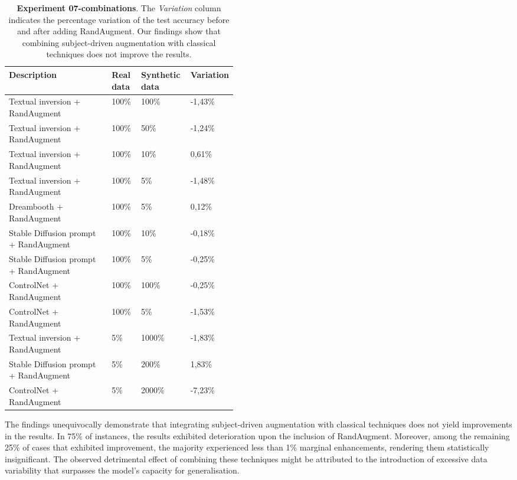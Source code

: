 \begin{table}[ht]
\centering
\begin{tabular}{|p{0.45\linewidth}|l|l|l|}
\hline
\cellcolor[HTML]{BFBFBF}\textbf{Description} & \cellcolor[HTML]{BFBFBF}\textbf{Real   data} & \cellcolor[HTML]{BFBFBF}\textbf{Synthetic   data} & \cellcolor[HTML]{BFBFBF}\textbf{Variation} \\ \hline
Textual inversion + RandAugment & 100\% & 100\% & -1,43\% \\ \hline
Textual inversion + RandAugment & 100\% & 50\% & -1,24\% \\ \hline
Textual inversion + RandAugment & 100\% & 10\% & 0,61\% \\ \hline
Textual inversion + RandAugment & 100\% & 5\% & -1,48\% \\ \hline
Dreambooth + RandAugment & 100\% & 5\% & 0,12\% \\ \hline
Stable Diffusion prompt + RandAugment & 100\% & 10\% & -0,18\% \\ \hline
Stable Diffusion prompt + RandAugment & 100\% & 5\% & -0,25\% \\ \hline
ControlNet + RandAugment & 100\% & 100\% & -0,25\% \\ \hline
ControlNet + RandAugment & 100\% & 5\% & -1,53\% \\ \hline
Textual inversion + RandAugment & 5\% & 1000\% & -1,83\% \\ \hline
Stable Diffusion prompt + RandAugment & 5\% & 200\% & 1,83\% \\ \hline
ControlNet + RandAugment & 5\% & 2000\% & -7,23\% \\ \hline
\end{tabular}
\caption{\textbf{Experiment 07-combinations}. The \textit{Variation} column indicates the percentage variation of the test accuracy before and after adding RandAugment. Our findings show that combining subject-driven augmentation with classical techniques does not improve the results.}
\label{table:TableExp07}
\end{table}

The findings unequivocally demonstrate that integrating subject-driven augmentation with classical techniques does not yield improvements in the results. In 75\% of instances, the results exhibited deterioration upon the inclusion of RandAugment. Moreover, among the remaining 25\% of cases that exhibited improvement, the majority experienced less than 1\% marginal enhancements, rendering them statistically insignificant. The observed detrimental effect of combining these techniques might be attributed to the introduction of excessive data variability that surpasses the model's capacity for generalisation.

